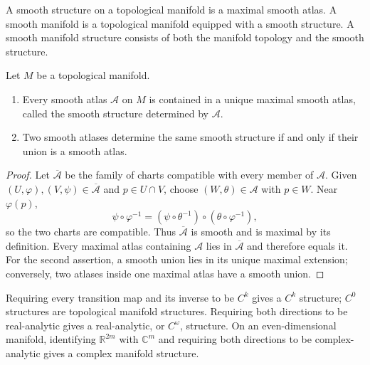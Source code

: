 \begin{definition}
\label{def:1-2-extra-5}




A smooth structure on a topological manifold is a maximal smooth atlas. A
smooth manifold is a topological manifold equipped with a smooth structure.
A smooth manifold structure consists of both the manifold topology and the
smooth structure.
\end{definition}

\begin{proposition}
\label{prop:1-17}




Let $M$ be a topological manifold.
\begin{enumerate}
\item Every smooth atlas $\mathcal A$ on $M$ is contained in a unique maximal
smooth atlas, called the smooth structure determined by $\mathcal A$.
\item Two smooth atlases determine the same smooth structure if and only if
their union is a smooth atlas.
\end{enumerate}
\end{proposition}

\begin{proof}

\sketch Let $\overline{\mathcal A}$ be the family of charts compatible with
every member of $\mathcal A$. Given $(U,\varphi),(V,\psi)\in
\overline{\mathcal A}$ and $p\in U\cap V$, choose $(W,\theta)\in\mathcal A$
with $p\in W$. Near $\varphi(p)$,
\[
\psi\circ\varphi^{-1}
=(\psi\circ\theta^{-1})\circ(\theta\circ\varphi^{-1}),
\]
so the two charts are compatible. Thus $\overline{\mathcal A}$ is smooth and
is maximal by its definition. Every maximal atlas containing $\mathcal A$ lies
in $\overline{\mathcal A}$ and therefore equals it. For the second assertion,
a smooth union lies in its unique maximal extension; conversely, two atlases
inside one maximal atlas have a smooth union.
\end{proof}


\begin{remark}
\label{rem:1-2-extra-6}



Requiring every transition map and its inverse to be $C^k$ gives a $C^k$
structure; $C^0$ structures are topological manifold structures. Requiring
both directions to be real-analytic gives a real-analytic, or $C^\omega$,
structure. On an even-dimensional manifold, identifying $\mathbb R^{2m}$ with
$\mathbb C^m$ and requiring both directions to be complex-analytic gives a
complex manifold structure.
\end{remark}


